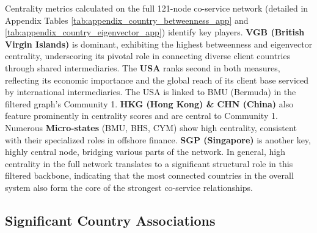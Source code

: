 Centrality metrics calculated on the full 121-node co-service network (detailed in Appendix Tables \ref{tab:appendix_country_betweenness_app} and \ref{tab:appendix_country_eigenvector_app}) identify key players.
\textbf{VGB (British Virgin Islands)} is dominant, exhibiting the highest betweenness and eigenvector centrality, underscoring its pivotal role in connecting diverse client countries through shared intermediaries. The \textbf{USA} ranks second in both measures, reflecting its economic importance and the global reach of its client base serviced by international intermediaries. The USA is linked to BMU (Bermuda) in the filtered graph's Community 1. \textbf{HKG (Hong Kong) \& CHN (China)} also feature prominently in centrality scores and are central to Community 1. Numerous \textbf{Micro-states} (BMU, BHS, CYM) show high centrality, consistent with their specialized roles in offshore finance. \textbf{SGP (Singapore)} is another key, highly central node, bridging various parts of the network. In general, high centrality in the full network translates to a significant structural role in this filtered backbone, indicating that the most connected countries in the overall system also form the core of the strongest co-service relationships.

\subsection{Significant Country Associations}

